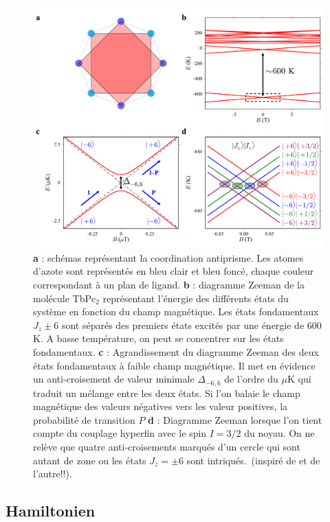 \begin{figure}
\centering \includegraphics[scale=0.45]{Resultats/TbPc2Mag/TbPc2Mag.pdf} 
\caption{\textbf{a} : schémas représentant la coordination antiprisme. Les atomes d'azote sont représentés en bleu clair et bleu foncé, chaque couleur correspondant à un plan de ligand. \textbf{b} : diagramme Zeeman de la molécule TbPc$_2$ représentant l'énergie des différents états du système en fonction du champ magnétique. Les états fondamentaux $J_z \pm 6$ sont séparés des premiers états excités par une énergie de $600$\,K. A basse température, on peut se concentrer sur les états fondamentaux. \textbf{c} : Agrandissement du diagramme Zeeman des deux états fondamentaux à faible champ magnétique. Il met en évidence un anti-croisement de valeur minimale $\Delta_{-6,6}$ de l'ordre du $\mu$K qui traduit un mélange entre les deux états. Si l'on balaie le champ magnétique des valeurs négatives vers les valeur positives, la probabilité de transition $P$ \textbf{d} : Diagramme Zeeman lorsque l'on tient compte du couplage hyperfin avec le spin $I=3/2$ du noyau. On ne relève que quatre anti-croisements marqués d'un cercle qui sont autant de zone ou les états $J_z =\pm6$ sont intriqués.~(inspiré de \cite{Ishikawa2005} et de l'autre!!).}
\label{TbPc2Zeeman}
\end{figure}


\subsection{Hamiltonien}

